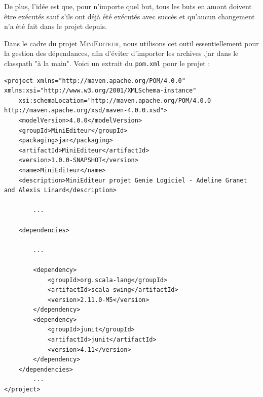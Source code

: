 \documentclass[a4paper,11pt]{article}
\begin{document}
De plus, l'idée est que, pour n'importe quel but, tous les buts en amont doivent être exécutés sauf s'ils ont déjà été exécutés avec succès et qu'aucun changement n'a été fait dans le projet depuis.


Dans le cadre du projet \textsc{MiniEditeur}, nous utilisons cet outil essentiellement pour la gestion des dépendances, afin d'éviter d'importer les archives .jar dans le classpath "à la main". Voici un extrait du \texttt{pom.xml} pour le projet :
\begin{lstlisting}[caption=Exemple de fichier pom.xml, label=ruleml]
<project xmlns="http://maven.apache.org/POM/4.0.0" xmlns:xsi="http://www.w3.org/2001/XMLSchema-instance"
	xsi:schemaLocation="http://maven.apache.org/POM/4.0.0 http://maven.apache.org/xsd/maven-4.0.0.xsd">
	<modelVersion>4.0.0</modelVersion>
	<groupId>MiniEditeur</groupId>
	<packaging>jar</packaging>
	<artifactId>MiniEditeur</artifactId>
	<version>1.0.0-SNAPSHOT</version>
	<name>MiniEditeur</name>
	<description>MiniEditeur projet Genie Logiciel - Adeline Granet and Alexis Linard</description>
	
		...
	
	<dependencies>
	
		...
	
		<dependency>
			<groupId>org.scala-lang</groupId>
			<artifactId>scala-swing</artifactId>
			<version>2.11.0-M5</version>
		</dependency>
		<dependency>
			<groupId>junit</groupId>
			<artifactId>junit</artifactId>
			<version>4.11</version>
		</dependency>
	</dependencies>
		...
</project>
\end{lstlisting}
\end{document}
